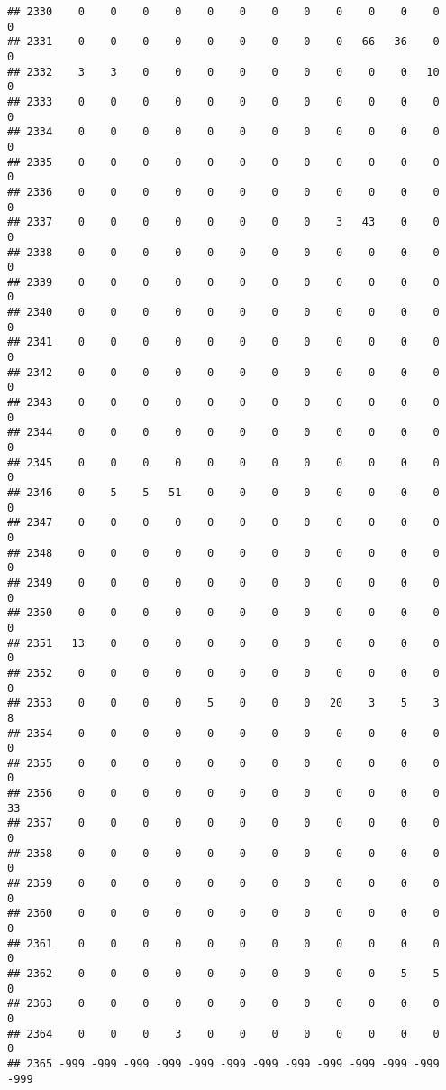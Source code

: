 \documentclass[]{article}
\begin{document}
\begin{verbatim}
## 2330    0    0    0    0    0    0    0    0    0    0    0    0    0
## 2331    0    0    0    0    0    0    0    0    0   66   36    0    0
## 2332    3    3    0    0    0    0    0    0    0    0    0   10    0
## 2333    0    0    0    0    0    0    0    0    0    0    0    0    0
## 2334    0    0    0    0    0    0    0    0    0    0    0    0    0
## 2335    0    0    0    0    0    0    0    0    0    0    0    0    0
## 2336    0    0    0    0    0    0    0    0    0    0    0    0    0
## 2337    0    0    0    0    0    0    0    0    3   43    0    0    0
## 2338    0    0    0    0    0    0    0    0    0    0    0    0    0
## 2339    0    0    0    0    0    0    0    0    0    0    0    0    0
## 2340    0    0    0    0    0    0    0    0    0    0    0    0    0
## 2341    0    0    0    0    0    0    0    0    0    0    0    0    0
## 2342    0    0    0    0    0    0    0    0    0    0    0    0    0
## 2343    0    0    0    0    0    0    0    0    0    0    0    0    0
## 2344    0    0    0    0    0    0    0    0    0    0    0    0    0
## 2345    0    0    0    0    0    0    0    0    0    0    0    0    0
## 2346    0    5    5   51    0    0    0    0    0    0    0    0    0
## 2347    0    0    0    0    0    0    0    0    0    0    0    0    0
## 2348    0    0    0    0    0    0    0    0    0    0    0    0    0
## 2349    0    0    0    0    0    0    0    0    0    0    0    0    0
## 2350    0    0    0    0    0    0    0    0    0    0    0    0    0
## 2351   13    0    0    0    0    0    0    0    0    0    0    0    0
## 2352    0    0    0    0    0    0    0    0    0    0    0    0    0
## 2353    0    0    0    0    5    0    0    0   20    3    5    3    8
## 2354    0    0    0    0    0    0    0    0    0    0    0    0    0
## 2355    0    0    0    0    0    0    0    0    0    0    0    0    0
## 2356    0    0    0    0    0    0    0    0    0    0    0    0   33
## 2357    0    0    0    0    0    0    0    0    0    0    0    0    0
## 2358    0    0    0    0    0    0    0    0    0    0    0    0    0
## 2359    0    0    0    0    0    0    0    0    0    0    0    0    0
## 2360    0    0    0    0    0    0    0    0    0    0    0    0    0
## 2361    0    0    0    0    0    0    0    0    0    0    0    0    0
## 2362    0    0    0    0    0    0    0    0    0    0    5    5    0
## 2363    0    0    0    0    0    0    0    0    0    0    0    0    0
## 2364    0    0    0    3    0    0    0    0    0    0    0    0    0
## 2365 -999 -999 -999 -999 -999 -999 -999 -999 -999 -999 -999 -999 -999

\end{verbatim}
\end{document}
